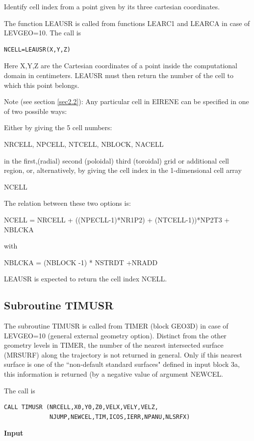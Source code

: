 Identify cell index from a point given by its three cartesian coordinates.

The function LEAUSR is called from functions LEARC1
and LEARCA in case of LEVGEO=10. The call is
\begin{verbatim}
NCELL=LEAUSR(X,Y,Z)
\end{verbatim}
Here X,Y,Z are the Cartesian
coordinates of a point inside the computational domain in centimeters.
LEAUSR must then return
the number of the cell to which this point belongs.

Note (see section \ref{sec2.2}): Any particular cell in EIRENE can be specified in
one of two possible ways:

Either by giving the 5 cell numbers:

NRCELL, NPCELL, NTCELL, NBLOCK, NACELL

in the first,(radial) second (poloidal) third (toroidal) grid or additional cell region,
or, alternatively, by giving the cell index in the 1-dimensional cell array

NCELL

\medskip
The relation between these two options is:

NCELL = NRCELL + ((NPECLL-1)*NR1P2) + (NTCELL-1))*NP2T3 + NBLCKA

with

NBLCKA = (NBLOCK -1) * NSTRDT +NRADD

LEAUSR is expected to return the cell index NCELL.



\subsection{Subroutine TIMUSR}
\label{sec3.8.2}
The subroutine TIMUSR is called from TIMER (block GEO3D) in case of LEVGEO=10 (general external geometry option).
Distinct from the other geometry levels in TIMER, the number of the nearest intersected surface (MRSURF) along the trajectory
is not returned in general. Only if this nearest surface is one of the ``non-default standard surfaces" defined in input
block 3a, this information is returned (by a negative value of argument NEWCEL.

The call is
\begin{verbatim}
CALL TIMUSR (NRCELL,X0,Y0,Z0,VELX,VELY,VELZ,
             NJUMP,NEWCEL,TIM,ICOS,IERR,NPANU,NLSRFX)
\end{verbatim}
{\bf Input}

